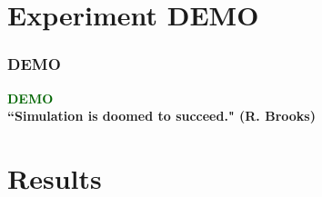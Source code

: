 \documentclass{beamer}
\begin{document}
\section{Experiment DEMO}

\begin{frame}
\frametitle{DEMO}

\begin{center}


\huge \textcolor{darkgreen}{\textbf{DEMO}}\\
\tiny \textbf{``Simulation is doomed to succeed." (R. Brooks) }
\end{center}

\end{frame}
\section{Results}
\end{document}
